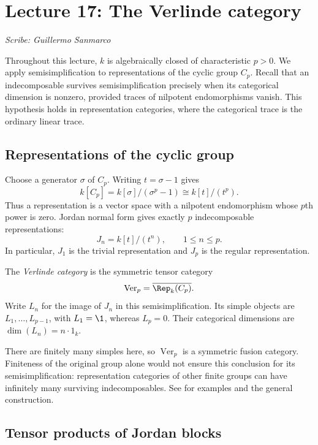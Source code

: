 \section{Lecture 17: The Verlinde category}
\label{lec17}
\noindent\textit{Scribe: Guillermo Sanmarco}

Throughout this lecture, $k$ is algebraically closed of characteristic
$p>0$. We apply semisimplification to representations of the cyclic group
$C_p$. Recall that an indecomposable survives semisimplification precisely
when its categorical dimension is nonzero, provided traces of nilpotent
endomorphisms vanish. This hypothesis holds in representation categories,
where the categorical trace is the ordinary linear trace.

\subsection{Representations of the cyclic group}

Choose a generator $\sigma$ of $C_p$. Writing $t=\sigma-1$ gives
\[
 k[C_p]=k[\sigma]/(\sigma^p-1)\cong k[t]/(t^p).
\]
Thus a representation is a vector space with a nilpotent endomorphism
whose $p$th power is zero. Jordan normal form gives exactly $p$
indecomposable representations:
\[
 J_n=k[t]/(t^n),\qquad 1\leq n\leq p.
\]
In particular, $J_1$ is the trivial representation and $J_p$ is the
regular representation.

\begin{definition}
The \emph{Verlinde category} is the symmetric tensor category
\[
 \operatorname{Ver}_p=\overline{\Rep_k(C_p)}.
\]
Write $L_n$ for the image of $J_n$ in this semisimplification. Its simple
objects are $L_1,\ldots,L_{p-1}$, with $L_1=\1$, whereas $L_p=0$.
Their categorical dimensions are $\dim(L_n)=n\cdot1_k$.
\end{definition}

There are finitely many simples here, so $\operatorname{Ver}_p$ is a
symmetric fusion category. Finiteness of the original group alone would
not ensure this conclusion for its semisimplification: representation
categories of other finite groups can have infinitely many surviving
indecomposables. See \cite{EOSemisimplification} for examples and the
general construction.

\subsection{Tensor products of Jordan blocks}

